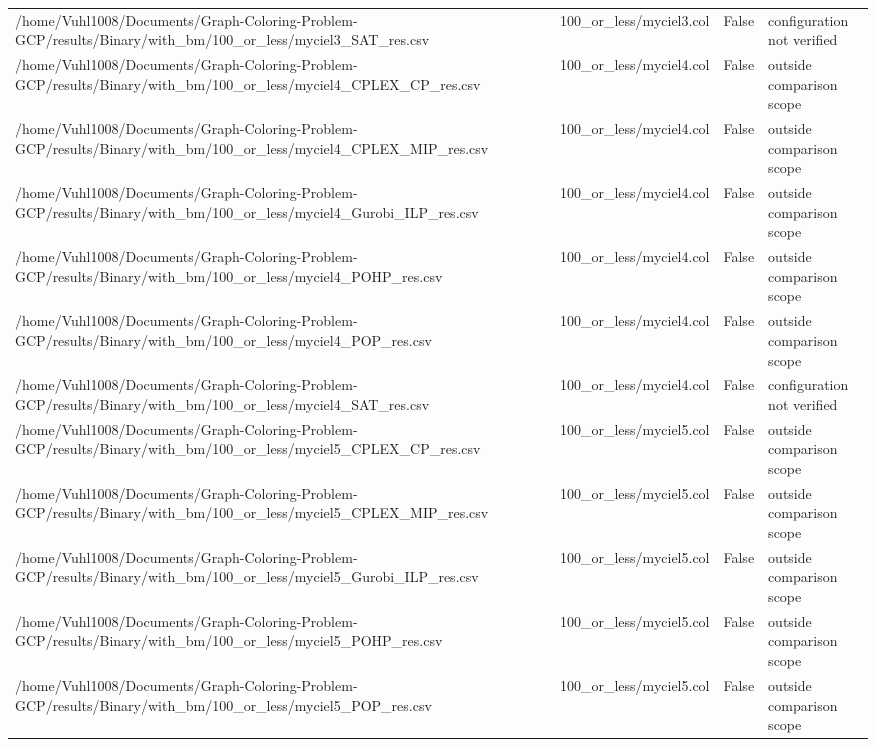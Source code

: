 \begin{table}[htbp]
\begin{tabular}{llll}
/home/Vuhl1008/Documents/Graph-Coloring-Problem-GCP/results/Binary/with\_bm/100\_or\_less/myciel3\_SAT\_res.csv & 100\_or\_less/myciel3.col & False & configuration not verified \\
/home/Vuhl1008/Documents/Graph-Coloring-Problem-GCP/results/Binary/with\_bm/100\_or\_less/myciel4\_CPLEX\_CP\_res.csv & 100\_or\_less/myciel4.col & False & outside comparison scope \\
/home/Vuhl1008/Documents/Graph-Coloring-Problem-GCP/results/Binary/with\_bm/100\_or\_less/myciel4\_CPLEX\_MIP\_res.csv & 100\_or\_less/myciel4.col & False & outside comparison scope \\
/home/Vuhl1008/Documents/Graph-Coloring-Problem-GCP/results/Binary/with\_bm/100\_or\_less/myciel4\_Gurobi\_ILP\_res.csv & 100\_or\_less/myciel4.col & False & outside comparison scope \\
/home/Vuhl1008/Documents/Graph-Coloring-Problem-GCP/results/Binary/with\_bm/100\_or\_less/myciel4\_POHP\_res.csv & 100\_or\_less/myciel4.col & False & outside comparison scope \\
/home/Vuhl1008/Documents/Graph-Coloring-Problem-GCP/results/Binary/with\_bm/100\_or\_less/myciel4\_POP\_res.csv & 100\_or\_less/myciel4.col & False & outside comparison scope \\
/home/Vuhl1008/Documents/Graph-Coloring-Problem-GCP/results/Binary/with\_bm/100\_or\_less/myciel4\_SAT\_res.csv & 100\_or\_less/myciel4.col & False & configuration not verified \\
/home/Vuhl1008/Documents/Graph-Coloring-Problem-GCP/results/Binary/with\_bm/100\_or\_less/myciel5\_CPLEX\_CP\_res.csv & 100\_or\_less/myciel5.col & False & outside comparison scope \\
/home/Vuhl1008/Documents/Graph-Coloring-Problem-GCP/results/Binary/with\_bm/100\_or\_less/myciel5\_CPLEX\_MIP\_res.csv & 100\_or\_less/myciel5.col & False & outside comparison scope \\
/home/Vuhl1008/Documents/Graph-Coloring-Problem-GCP/results/Binary/with\_bm/100\_or\_less/myciel5\_Gurobi\_ILP\_res.csv & 100\_or\_less/myciel5.col & False & outside comparison scope \\
/home/Vuhl1008/Documents/Graph-Coloring-Problem-GCP/results/Binary/with\_bm/100\_or\_less/myciel5\_POHP\_res.csv & 100\_or\_less/myciel5.col & False & outside comparison scope \\
/home/Vuhl1008/Documents/Graph-Coloring-Problem-GCP/results/Binary/with\_bm/100\_or\_less/myciel5\_POP\_res.csv & 100\_or\_less/myciel5.col & False & outside comparison scope \\

\end{tabular}
\end{table}
